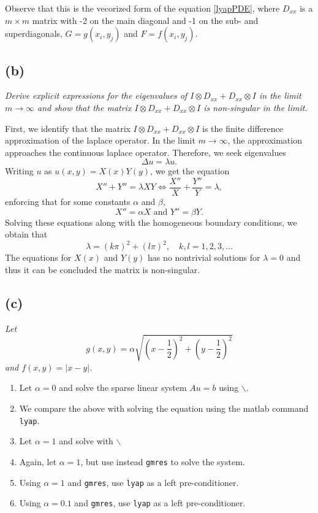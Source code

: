 Observe that this is the vecorized form of the equation \eqref{lyapPDE}, where
$D_{xx}$ is a $m\times m$ matrix with -2 on the main diagonal and -1 on the sub- and superdiagonals, $G = g(x_i,y_j)$ and $F = f(x_i,y_j)$. 
\subsection*{(b)}
\emph{Derive explicit expressions for the eigenvalues of $I\otimes D_{xx}+D_{xx}\otimes I$ in the limit $m\to\infty$ and show that the matrix $I\otimes D_{xx}+D_{xx}\otimes I$ is non-singular in the limit.}

First, we identify that the matrix $I\otimes D_{xx}+D_{xx}\otimes I$ is the finite difference approximation of the laplace operator. In the limit $m\to\infty$, the approximation approaches the continuous laplace operator. Therefore, we seek eigenvalues
\begin{equation}
\Delta u = \lambda u.
\end{equation} 
Writing $u$ as $u(x,y) = X(x)Y(y)$, we get the equation
\begin{equation}
X''+Y'' = \lambda XY \Leftrightarrow \frac{X''}{X}+\frac{Y''}{Y} = \lambda,
\end{equation}
enforcing that for some constants $\alpha$ and $\beta$, 
\begin{equation}
X''=\alpha X\text{ and }Y'' = \beta Y.
\end{equation}
Solving these equations along with the homogeneous boundary conditions, we obtain that 
\begin{equation}
\lambda = (k\pi)^2+(l\pi)^2,\quad k,l = 1,2,3,...
\end{equation}
The equations for $X(x)$ and $Y(y)$ has no nontrivial solutions for $\lambda =0$ and thus it can be concluded the matrix is non-singular. 
\subsection*{(c)}
\emph{Let 
\begin{equation}
g(x,y) = \alpha\sqrt{(x-\frac{1}{2})^2+(y-\frac{1}{2})^2}
\end{equation}
and $f(x,y)= |x-y|$.}
\begin{enumerate}
\item Let $\alpha = 0$ and solve the sparse linear system $Au = b$ using $\backslash$. 
\item We compare the above with solving the equation using the matlab command \texttt{lyap}.
\item Let $\alpha = 1$ and solve with $\backslash$
\item Again, let $\alpha = 1$, but use instead \texttt{gmres} to solve the system.
\item Using $\alpha = 1$ and \texttt{gmres}, use \texttt{lyap} as a left pre-conditioner. 
\item Using $\alpha = 0.1$ and \texttt{gmres}, use \texttt{lyap} as a left pre-conditioner. 
\end{enumerate}

